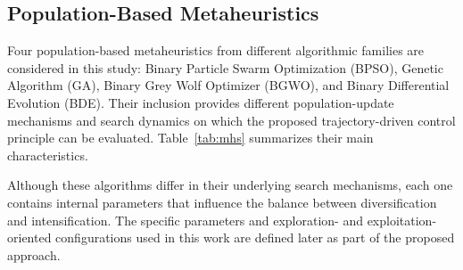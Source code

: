 \documentclass[mathematics,article,accept,moreauthors]{Definitions/mdpi}
\begin{document}
\subsection{Population-Based Metaheuristics}

Four population-based metaheuristics from different algorithmic families are
considered in this study: Binary Particle Swarm Optimization (BPSO), Genetic
Algorithm (GA), Binary Grey Wolf Optimizer (BGWO), and Binary Differential
Evolution (BDE). Their inclusion provides different population-update
mechanisms and search dynamics on which the proposed trajectory-driven control
principle can be evaluated. Table~\ref{tab:mhs} summarizes their main
characteristics.



Although these algorithms differ in their underlying search mechanisms, each
one contains internal parameters that influence the balance between
diversification and intensification. The specific parameters and
exploration- and exploitation-oriented configurations used in this work are
defined later as part of the proposed approach.
\end{document}
